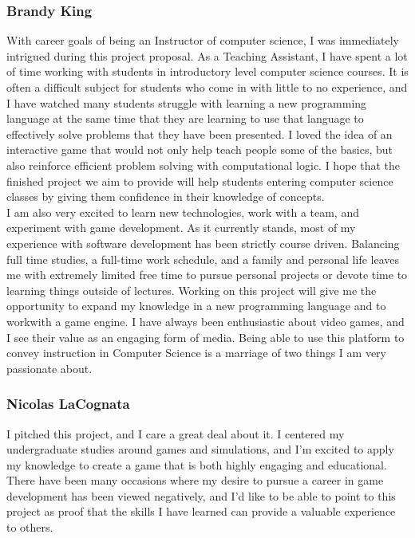 \subsubsection{Brandy King}
With career goals of being an Instructor of computer science, I was immediately intrigued during this project proposal. As a Teaching Assistant, I have spent a lot of time working with students in introductory level computer science courses. It is often a difficult subject for students who come in with little to no experience, and I have watched many students struggle with learning a new programming language at the same time that they are learning to use that language to effectively solve problems that they have been presented. I loved
the idea of an interactive game that would not only help teach people some of the basics, but also reinforce efficient problem solving with computational logic. I hope that the finished project we aim to provide will help students entering computer science classes by giving them confidence in their knowledge of concepts.\\

I am also very excited to learn new technologies, work with a team, and experiment with game development. As it currently stands, most of my experience with software development has been strictly course driven. Balancing full time studies, a full-time work schedule, and a family and personal life leaves me with extremely limited free time to pursue personal projects or devote time to learning things outside of lectures. Working on this project will give me the opportunity to expand my knowledge in a new programming language and to workwith a game engine. I have always been enthusiastic about video games, and I see their value as an engaging form of media. Being able to use this platform to convey instruction in Computer Science is a marriage of two things I am very passionate about.\\

\subsubsection{Nicolas LaCognata}
I pitched this project, and I care a great deal about it. I centered my undergraduate studies around games and simulations, and I’m excited to apply my knowledge to create a game that is both highly engaging and educational. There have been many occasions where my desire to pursue a career in game development has been viewed negatively, and I’d like to be able to point to this project as proof that the skills I have learned can provide a valuable experience to others.\\

